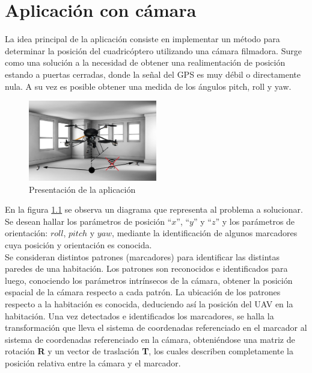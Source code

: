 \documentclass[main]{subfiles}
\begin{document}
\chapter{Aplicación con cámara}
\label{chap:camara}

La idea principal de la aplicación consiste en implementar un método para determinar la posición del cuadricóptero utilizando una cámara filmadora. Surge como una solución a la necesidad de obtener una realimentación de posición estando a puertas cerradas, donde la señal del GPS es muy débil o directamente nula. A su vez es posible obtener una medida de los ángulos pitch, roll y yaw.\\

\begin{figure}
	\begin{center}
		\includegraphics[width=0.5\textwidth]{./pics_camara/presentacion.jpg}
	\end{center}
	\caption{Presentación de la aplicación}
	\label{fig:presentacion}
\end{figure}

En la figura \ref{fig:presentacion} se observa un diagrama que representa al problema a solucionar. Se desean hallar los parámetros de posición ``$x$'', ``$y$'' y ``$z$'' y los parámetros de orientación: $roll$, $pitch$ y $yaw$, mediante la identificación de algunos marcadores cuya posición y orientación es conocida.\\

Se consideran distintos patrones (marcadores) para identificar las distintas paredes de una habitación. Los patrones son reconocidos e identificados para luego, conociendo los parámetros intrínsecos de la cámara, obtener la posición espacial de la cámara respecto a cada patrón. La ubicación de los patrones respecto a la habitación es conocida, deduciendo así la posición del UAV en la habitación. Una vez detectados e identificados los marcadores, se halla la transformación que lleva el sistema de coordenadas referenciado en el marcador al sistema de coordenadas referenciado en la cámara, obteniéndose una matriz de rotación \textbf{R} y un vector de traslación \textbf{T}, los cuales describen completamente la posición relativa entre la cámara y el marcador.\\
\end{document}
